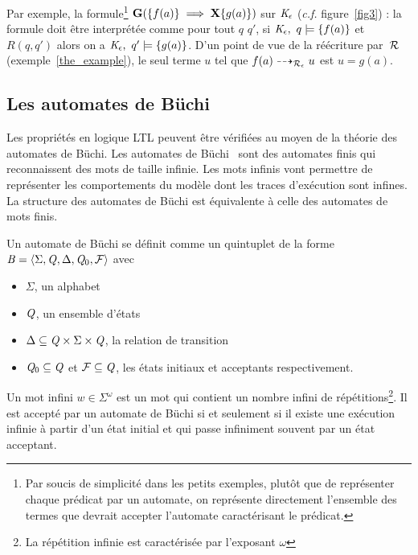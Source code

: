 Par exemple, la formule\footnote{\footnotesize Par soucis de simplicité dans les 
  petits exemples, plutôt que de représenter chaque prédicat par un automate, on représente directement 
  l'ensemble des termes que devrait accepter l'automate caractérisant le prédicat.}
  $\mathbf G(\{f(a)\} \; \Longrightarrow \; \mathbf X \{g(a)\})$ sur $\mathit K_\epsilon$ (\textit{c.f.} figure~\ref{fig3}) : la formule
doit être interprétée comme pour tout $q$ $q'$, si $\mathit K_\epsilon,\ q \models \{f(a)\}$ et $R(q, q')$ alors
on a  $\mathit K_\epsilon,\ q' \models \{g(a)\}$. D'un point de vue de la réécriture par~$\mathcal R$ (exemple~\ref{the_example}), le seul terme
$u$ tel que $f(a) \dashrightarrow_{\mathcal R_\epsilon} u$ est $u = g(a)$.


\subsection{Les automates de Büchi}


Les propriétés en logique LTL peuvent être vérifiées au moyen de la théorie des automates de Büchi.
Les automates de Büchi~\cite{Buchi} sont des automates finis qui reconnaissent des mots de taille infinie. 
Les mots infinis vont permettre de représenter les comportements du modèle dont les traces d'exécution
sont infines. La structure des automates de Büchi est équivalente à celle des automates de mots finis.

\begin{definition}
  Un automate de Büchi se définit comme un quintuplet de la forme $\mathit B = \langle \Sigma, \mathit Q, \Delta, \mathit Q_0, \mathcal{F}\rangle$
  avec
  \begin{itemize}
  \item $\Sigma$, un alphabet
  \item $\mathit Q$, un ensemble d'états 
  \item $\Delta \subseteq \mathit Q \times \Sigma \times \mathit Q$, la relation de transition
  \item $\mathit Q_0 \subseteq \mathit Q$ et $\mathcal{F} \subseteq \mathit Q$, les états initiaux et acceptants respectivement.
  \end{itemize}
\end{definition}
Un mot infini $w \in \Sigma^\omega$ est un mot qui contient un nombre
infini de répétitions\footnote{\footnotesize La répétition infinie est
  caractérisée par l'exposant $\omega$}. Il est accepté par un
automate de Büchi si et seulement si il existe une exécution infinie à
partir d'un état initial et qui passe infiniment souvent par un état
acceptant.

